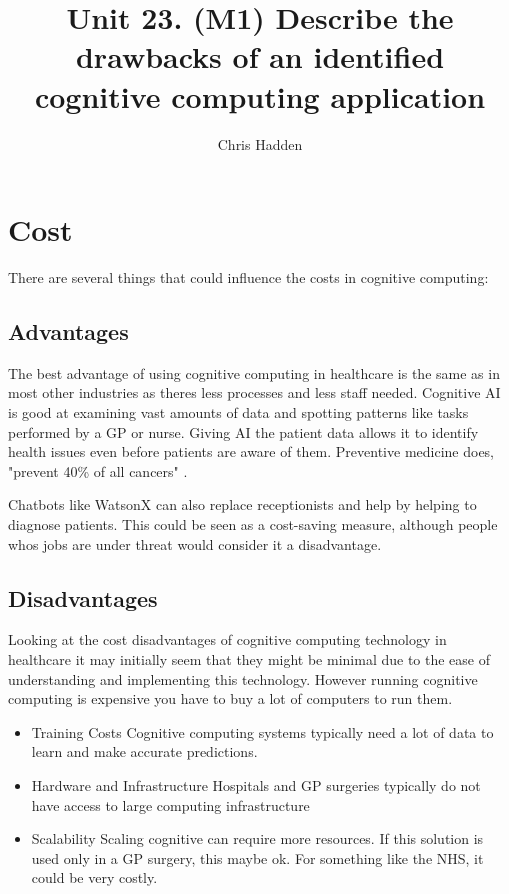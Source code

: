 \documentclass{article}
\title{Unit 23. (M1) Describe the drawbacks of an identified cognitive computing application}
\author{Chris Hadden}
\date{}
\begin{document}
\maketitle

\section{Cost}\label{cost}
There are several things that could influence the costs in cognitive computing:

\subsection{Advantages}
The best advantage of using cognitive computing in healthcare is the same as in most other industries as theres less processes and less staff needed. Cognitive AI is good at examining vast amounts of data and spotting patterns like tasks performed by a GP or nurse. Giving AI the patient data allows it to identify health issues even before patients are aware of them. Preventive medicine does, "prevent 40\% of all cancers" \cite{prevention}.

Chatbots like WatsonX can also replace receptionists and help by helping to diagnose patients. This could be seen as a cost-saving measure, although people whos jobs are under threat would consider it a disadvantage.

\subsection{Disadvantages}
Looking at the cost disadvantages of cognitive computing technology in healthcare it may initially seem that they might be minimal due to the ease of understanding and implementing this technology. However running cognitive computing is expensive you have to buy a lot of computers to run them.

\begin{itemize}
\item Training Costs Cognitive computing systems typically need a lot of data to learn and make accurate predictions. 

\item Hardware and Infrastructure Hospitals and GP surgeries typically do not have access to large computing infrastructure

\item Scalability Scaling cognitive can require more resources. If this solution is used only in a GP surgery, this maybe ok. For something like the NHS, it could be very costly.
\end{itemize}
\end{document}
